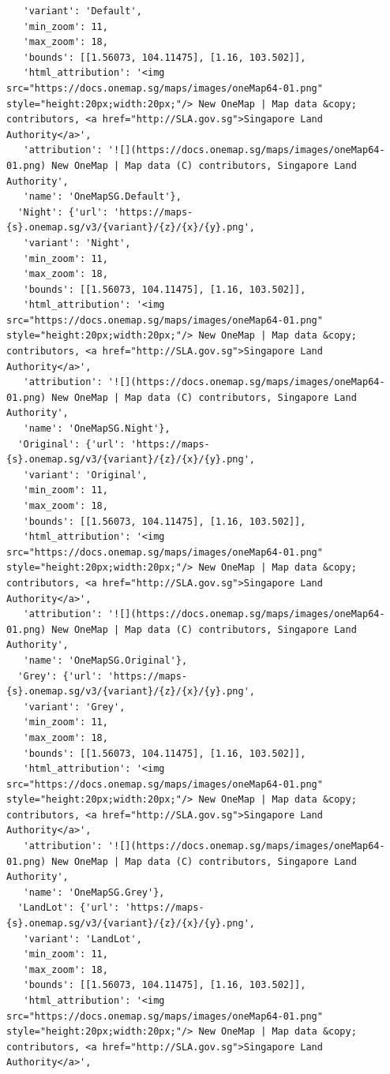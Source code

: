 \documentclass[
  letterpaper,
  DIV=11,
  numbers=noendperiod]{scrreprt}
\begin{document}
\begin{verbatim}
   'variant': 'Default',
   'min_zoom': 11,
   'max_zoom': 18,
   'bounds': [[1.56073, 104.11475], [1.16, 103.502]],
   'html_attribution': '<img src="https://docs.onemap.sg/maps/images/oneMap64-01.png" style="height:20px;width:20px;"/> New OneMap | Map data &copy; contributors, <a href="http://SLA.gov.sg">Singapore Land Authority</a>',
   'attribution': '![](https://docs.onemap.sg/maps/images/oneMap64-01.png) New OneMap | Map data (C) contributors, Singapore Land Authority',
   'name': 'OneMapSG.Default'},
  'Night': {'url': 'https://maps-{s}.onemap.sg/v3/{variant}/{z}/{x}/{y}.png',
   'variant': 'Night',
   'min_zoom': 11,
   'max_zoom': 18,
   'bounds': [[1.56073, 104.11475], [1.16, 103.502]],
   'html_attribution': '<img src="https://docs.onemap.sg/maps/images/oneMap64-01.png" style="height:20px;width:20px;"/> New OneMap | Map data &copy; contributors, <a href="http://SLA.gov.sg">Singapore Land Authority</a>',
   'attribution': '![](https://docs.onemap.sg/maps/images/oneMap64-01.png) New OneMap | Map data (C) contributors, Singapore Land Authority',
   'name': 'OneMapSG.Night'},
  'Original': {'url': 'https://maps-{s}.onemap.sg/v3/{variant}/{z}/{x}/{y}.png',
   'variant': 'Original',
   'min_zoom': 11,
   'max_zoom': 18,
   'bounds': [[1.56073, 104.11475], [1.16, 103.502]],
   'html_attribution': '<img src="https://docs.onemap.sg/maps/images/oneMap64-01.png" style="height:20px;width:20px;"/> New OneMap | Map data &copy; contributors, <a href="http://SLA.gov.sg">Singapore Land Authority</a>',
   'attribution': '![](https://docs.onemap.sg/maps/images/oneMap64-01.png) New OneMap | Map data (C) contributors, Singapore Land Authority',
   'name': 'OneMapSG.Original'},
  'Grey': {'url': 'https://maps-{s}.onemap.sg/v3/{variant}/{z}/{x}/{y}.png',
   'variant': 'Grey',
   'min_zoom': 11,
   'max_zoom': 18,
   'bounds': [[1.56073, 104.11475], [1.16, 103.502]],
   'html_attribution': '<img src="https://docs.onemap.sg/maps/images/oneMap64-01.png" style="height:20px;width:20px;"/> New OneMap | Map data &copy; contributors, <a href="http://SLA.gov.sg">Singapore Land Authority</a>',
   'attribution': '![](https://docs.onemap.sg/maps/images/oneMap64-01.png) New OneMap | Map data (C) contributors, Singapore Land Authority',
   'name': 'OneMapSG.Grey'},
  'LandLot': {'url': 'https://maps-{s}.onemap.sg/v3/{variant}/{z}/{x}/{y}.png',
   'variant': 'LandLot',
   'min_zoom': 11,
   'max_zoom': 18,
   'bounds': [[1.56073, 104.11475], [1.16, 103.502]],
   'html_attribution': '<img src="https://docs.onemap.sg/maps/images/oneMap64-01.png" style="height:20px;width:20px;"/> New OneMap | Map data &copy; contributors, <a href="http://SLA.gov.sg">Singapore Land Authority</a>',

\end{verbatim}
\end{document}
